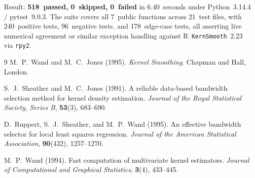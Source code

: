 \documentclass[12pt,a4paper]{article}
\begin{document}
Result: \textbf{518~passed, 0~skipped, 0~failed} in 6.40~seconds under Python~3.14.4 / pytest~9.0.3. The suite covers all 7~public functions across 21~test files, with 240~positive tests, 96~negative tests, and 178~edge-case tests, all asserting live numerical agreement or similar exception handling against R~\texttt{KernSmooth}~2.23 via \texttt{rpy2}.


\begin{thebibliography}{9}
  M.~P.~Wand and M.~C.~Jones (1995).
  \textit{Kernel Smoothing}.
  Chapman and Hall, London.

  S.~J.~Sheather and M.~C.~Jones (1991).
  A reliable data-based bandwidth selection method for kernel density estimation.
  \textit{Journal of the Royal Statistical Society, Series B}, \textbf{53}(3), 683--690.

  D.~Ruppert, S.~J.~Sheather, and M.~P.~Wand (1995).
  An effective bandwidth selector for local least squares regression.
  \textit{Journal of the American Statistical Association}, \textbf{90}(432), 1257--1270.

  M.~P.~Wand (1994).
  Fast computation of multivariate kernel estimators.
  \textit{Journal of Computational and Graphical Statistics}, \textbf{3}(4), 433--445.
\end{thebibliography}

\end{document}

